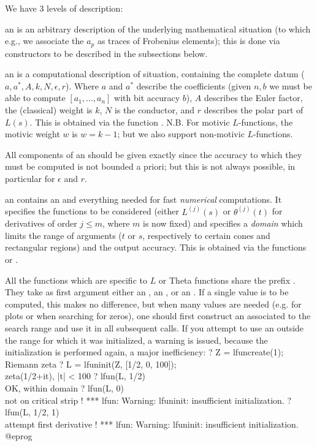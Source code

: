 
We have 3 levels of description:

\item an  is an arbitrary description of the underlying
mathematical situation (to which e.g., we associate the $a_p$ as traces of
Frobenius elements); this is done via constructors to be described in the
subsections below.

\item an  is a computational description of situation, containing
the complete datum ($a,a^*,A,k,N,\epsilon,r$). Where $a$ and $a^*$ describe
the coefficients (given $n,b$ we must be able to compute $[a_1,\dots,a_n]$
with bit accuracy $b$), $A$ describes the Euler factor, the (classical) weight
is $k$, $N$ is the conductor, and $r$ describes the polar part of $L(s)$.
This is obtained via the function . N.B. For motivic
$L$-functions, the motivic weight $w$ is $w = k-1$; but we also support
non-motivic $L$-functions.

 All components of an  should be given
exactly since the accuracy to which they must be computed is not bounded a
priori; but this is not always possible, in particular for $\epsilon$ and $r$.

\item an  contains an  and everything needed for fast
\emph{numerical} computations. It specifies the functions to be considered
(either $L^{(j)}(s)$ or $\theta^{(j)}(t)$ for derivatives of order $j \leq
m$, where $m$ is now fixed) and specifies a \emph{domain} which limits
the range of arguments ($t$ or $s$, respectively to certain cones and
rectangular regions) and the output accuracy. This is obtained via the
functions  or .

All the functions which are specific to $L$ or Theta functions share the
prefix . They take as first argument either an , an
, or an . If a single value is to be computed,
this makes no difference, but when many values are needed (e.g. for plots or
when searching for zeros), one should first construct an 
associated to the search range and use it in all subsequent calls.
If you attempt to use an  outside the range for which it was
initialized, a warning is issued, because the initialization is
performed again, a major inefficiency:
\bprog
? Z = lfuncreate(1); \\ Riemann zeta
? L = lfuninit(Z, [1/2, 0, 100]); \\ zeta(1/2+it), |t| < 100
? lfun(L, 1/2)    \\ OK, within domain
? lfun(L, 0)      \\ not on critical strip !
  *** lfun: Warning: lfuninit: insufficient initialization.
? lfun(L, 1/2, 1) \\ attempt first derivative !
*** lfun: Warning: lfuninit: insufficient initialization.
@eprog

